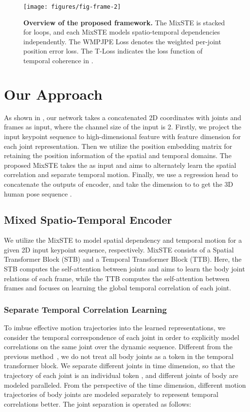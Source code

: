 \documentclass[10pt,twocolumn,letterpaper]{article}
\begin{document}
	\begin{figure}[htp]
		\centering
		\texttt{[image: figures/fig-frame-2]}
		\caption{
			\textbf{Overview of the proposed framework.} 
The MixSTE is stacked for  loops, and each MixSTE models spatio-temporal dependencies independently. The WMPJPE Loss denotes the weighted per-joint position error loss. The T-Loss indicates the loss function of temporal coherence in .
		}
		\label{fig:frame}
		\vspace{-0.3cm}
	\end{figure}
	
	\section{Our Approach}


As shown in , our network takes a concatenated 2D coordinates  with  joints and  frames as input, where the channel size of the input is 2.
Firstly, we project the input keypoint sequence  to high-dimensional feature  with feature dimension  for each joint representation.
	Then we utilize the position embedding matrix for retaining the position information of the spatial and temporal domains. 
	The proposed MixSTE takes the  as input and aims to alternately learn the spatial correlation and separate temporal motion.
Finally, we use a regression head to concatenate the outputs  of encoder, and take the dimension  to  to get the 3D human pose sequence . 


\subsection{Mixed Spatio-Temporal Encoder}
	\label{sec:mixste}
	We utilize the MixSTE to model spatial dependency and temporal motion for a given 2D input keypoint sequence, respectively.
	MixSTE consists of a Spatial Transformer Block (STB) and a Temporal Transformer Block (TTB). 
	Here, the STB computes the self-attention between joints and aims to learn the body joint relations of each frame, while the TTB computes the self-attention between frames and focuses on learning the global temporal correlation of each joint.
	\subsubsection{Separate Temporal Correlation Learning}
To imbue effective motion trajectories into the learned representations, we consider the temporal correspondence of each joint in order to explicitly model correlations on the same joint over the dynamic sequence.
Different from the previous method~\cite{poseformer}, we do not treat all body joints as a token in the temporal transformer block.
	We separate different joints in time dimension, so that the trajectory of each joint is an individual token , and different joints of body are modeled paralleled.
	From the perspective of the time dimension, different motion trajectories of body joints are modeled separately to represent temporal correlations better.
	The joint separation is operated as follows:
	
\end{document}
